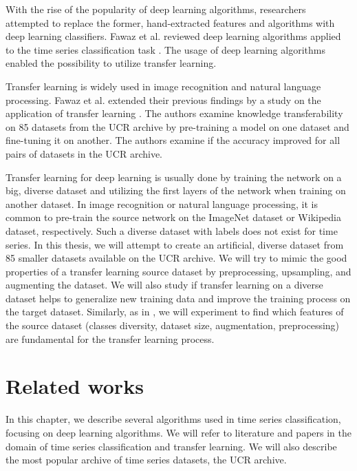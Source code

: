 \documentclass[a4paper,11pt,twoside]{report}
\theoremstyle{definition}
\begin{document}
With the rise of the popularity of deep learning algorithms, researchers attempted to replace the former, hand-extracted features and algorithms with deep learning classifiers. Fawaz et al. reviewed deep learning algorithms applied to the time series classification task \cite{dl_tsc}. The usage of deep learning algorithms enabled the possibility to utilize transfer learning.

Transfer learning is widely used in image recognition and natural language processing. Fawaz et al. extended their previous findings by a study on the application of transfer learning \cite{dl_tsc}. The authors examine knowledge transferability on 85 datasets from the UCR archive by pre-training a model on one dataset and fine-tuning it on another. The authors examine if the accuracy improved for all pairs of datasets in the UCR archive.

Transfer learning for deep learning is usually done by training the network on a big, diverse dataset and utilizing the first layers of the network when training on another dataset. In image recognition or natural language processing, it is common to pre-train the source network on the ImageNet dataset or Wikipedia dataset, respectively. Such a diverse dataset with labels does not exist for time series. In this thesis, we will attempt to create an artificial, diverse dataset from 85 smaller datasets available on the UCR archive. We will try to mimic the good properties of a transfer learning source dataset by preprocessing, upsampling, and augmenting the dataset. We will also study if transfer learning on a diverse dataset helps to generalize new training data and improve the training process on the target dataset. Similarly, as in \cite{imagnet}, we will experiment to find which features of the source dataset (classes diversity, dataset size, augmentation, preprocessing) are fundamental for the transfer learning process.
\chapter{Related works}
In this chapter, we describe several algorithms used in time series classification, focusing on deep learning algorithms. We will refer to literature and papers in the domain of time series classification and transfer learning. We will also describe the most popular archive of time series datasets, the UCR archive.
\end{document}
